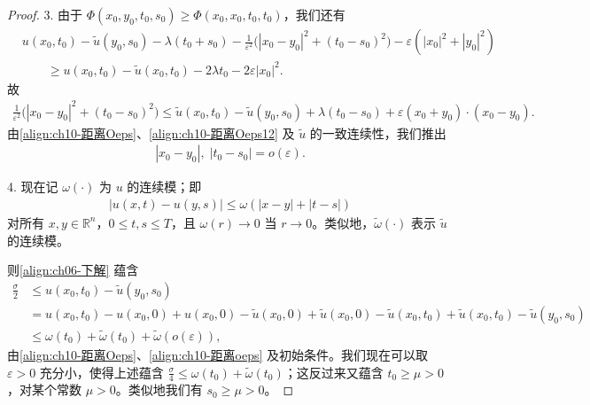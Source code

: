 \documentclass[../../main.tex]{subfiles}
\begin{document}
\begin{proof}
3. 由于 $\Phi(x_0,y_0,t_0,s_0)\geqslant\Phi(x_0,x_0,t_0,t_0)$，我们还有
\begin{align*}
&u(x_0,t_0)-\widetilde{u}(y_0,s_0)-\lambda(t_0+s_0)-\frac{1}{\varepsilon^2}\big(|x_0-y_0|^2+(t_0-s_0)^2\big)-\varepsilon(|x_0|^2+|y_0|^2)\\
&\qquad\geqslant u(x_0,t_0)-\widetilde{u}(x_0,t_0)-2\lambda t_0-2\varepsilon|x_0|^2.
\end{align*}
故
\begin{align*}
\frac{1}{\varepsilon^2}\big(|x_0-y_0|^2+(t_0-s_0)^2\big)\leqslant \widetilde{u}(x_0,t_0)-\widetilde{u}(y_0,s_0)+\lambda(t_0-s_0)+\varepsilon(x_0+y_0)\cdot(x_0-y_0).
\end{align*}
由\eqref{align:ch10-距离Oeps}、\eqref{align:ch10-距离Oeps12} 及 $\widetilde{u}$ 的一致连续性，我们推出
\begin{align}
|x_0-y_0|,\;|t_0-s_0| = o(\varepsilon).
\label{align:ch10-距离oeps}
\end{align}

4. 现在记 $\omega(\cdot)$ 为 $u$ 的连续模；即
\begin{align*}
|u(x,t)-u(y,s)|\leqslant\omega(|x-y|+|t-s|)
\end{align*}
对所有 $x,y\in\mathbb{R}^n$，$0\leqslant t,s\leqslant T$，且 $\omega(r)\to 0$ 当 $r\to 0$。类似地，$\widetilde{\omega}(\cdot)$ 表示 $\widetilde{u}$ 的连续模。

则\eqref{align:ch06-下解} 蕴含
\begin{align*}
\frac{\sigma}{2} &\leqslant u(x_0,t_0)-\widetilde{u}(y_0,s_0)\\
&= u(x_0,t_0)-u(x_0,0)+u(x_0,0)-\widetilde{u}(x_0,0)+\widetilde{u}(x_0,0)-\widetilde{u}(x_0,t_0)+\widetilde{u}(x_0,t_0)-\widetilde{u}(y_0,s_0)\\
&\leqslant \omega(t_0)+\widetilde{\omega}(t_0)+\widetilde{\omega}(o(\varepsilon)),
\end{align*}
由\eqref{align:ch10-距离Oeps}、\eqref{align:ch10-距离oeps} 及初始条件。我们现在可以取 $\varepsilon>0$ 充分小，使得上述蕴含 $\frac{\sigma}{4}\leqslant\omega(t_0)+\widetilde{\omega}(t_0)$；这反过来又蕴含 $t_0\geqslant\mu>0$，对某个常数 $\mu>0$。类似地我们有 $s_0\geqslant\mu>0$。


\end{proof}
\end{document}

